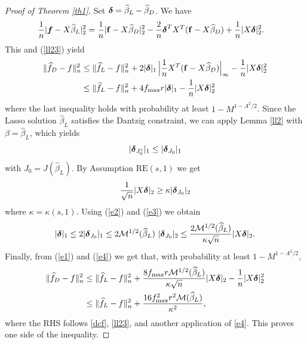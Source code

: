 \documentclass[dvips,aos]{imsart}
\numberwithin{equation}{section}
\theoremstyle{plain}
\def\wideth{\widehat}
\def\scm{{\cal M}}
\def\wh{\widehat}
\def\RE#1#2{$\text{RE}(#1,#2)$}
\newcommand{\bD}{\mbox{\boldmath$\delta$}}
\newcommand{\bmf}{\mbox{\boldmath$f$}}
\begin{document}






\begin{proof}[Proof of Theorem \ref{th1}] Set $\bD=\wh\beta_L-\wh\beta_D$. We have
\begin{eqnarray*}
\frac{1}{n}|{\bmf}-X\wh \beta_L|_2^2 &= \frac{1}{n}|{\bf f}-X\wh
\beta_D|_2^2 -\frac{2}{n}\bD^TX^T({\bf f}-X\wh \beta_D) +
\frac{1}{n}|X \bD|^2_2.
\end{eqnarray*}
This and (\ref{ll23}) yield
\begin{equation}\label{e1}
\begin{split}
\| \wideth f_D -f\|_n^2 &\le \| \wideth{f}_L -f \|_n^2 +
2|\bD|_1 \, \Big|\frac{1}{n}X^T({\bf f}-X\wh \beta_D)\Big|_\infty
- \frac{1}{n}|X \bD|^2_2\\
%
 &\le \| \wideth{f}_L -f \|_n^2 + 4f_{\max}r|\bD|_1 -
\frac{1}{n}|X \bD|^2_2
\end{split}\end{equation}
where the last inequality holds with probability at least
$1-M^{1-A^2/2}$. Since the Lasso solution $\wh \beta_L$ satisfies
the Dantzig constraint, we can apply Lemma \ref{ll2} with $
\beta=\wh \beta_L$, which yields
\begin{equation}\begin{split}\label{e2}
|\bD_{J_{0}^c}|_1 \le |\bD_{J_0}|_1
\end{split}\end{equation}
with $J_0=J(\wh \beta_L)$. By Assumption \RE s1 we get
\begin{equation}\begin{split}\label{e3}
\frac{1}{\sqrt{n}}|X \bD|_2 \ge \kappa |\bD_{J_{0}}|_2
\end{split}\end{equation}
where $\kappa=\kappa(s,1)$. Using (\ref{e2}) and (\ref{e3}) we
obtain
\begin{equation}\begin{split}\label{e4}
|\bD|_1 \le 2|\bD_{J_{0}}|_1\le 2 \scm^{1/2}(\wh \beta_L)\
|\bD_{J_{0}}|_2\le \frac{2 \scm^{1/2}(\wh \beta_L)}{\kappa\sqrt{n}}|X
\bD|_2.
\end{split}\end{equation}
Finally, from (\ref{e1}) and (\ref{e4}) we get that, with
probability at least $1-M^{1-A^2/2}$,
\begin{equation}\label{e5a}
\begin{split}
\| \wideth f_D -f\|_n^2 &\le \| \wideth{f}_L -f \|_n^2 +
\frac{8 f_{\max} r \scm^{1/2}(\wh \beta_L)}{\kappa\sqrt{n}}|X \bD|_2
- \frac{1}{n}|X \bD|^2_2\\
%
&\le \| \wideth{f}_L -f \|_n^2 + \frac{16 f_{\max}^2 r^2 \scm(\wh
\beta_L)}{\kappa^2},
\end{split}\end{equation}
where the RHS follows  \eqref{dcf},  \eqref{ll23}, and another application of \eqref{e4}. This proves one side of the inequality.


\end{proof}
\end{document}
